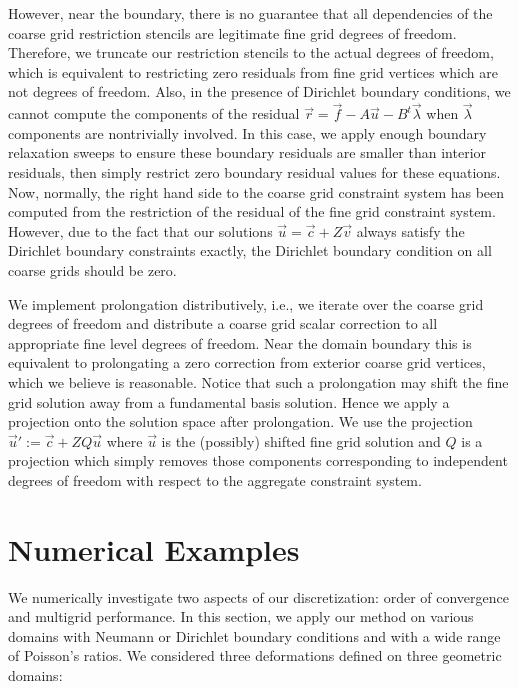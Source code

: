 However, near the boundary, there is no guarantee that all dependencies of the coarse grid restriction stencils are legitimate fine grid degrees of freedom. Therefore, we truncate our restriction stencils to the actual degrees of freedom, which is equivalent to restricting zero residuals from fine grid vertices which are not degrees of freedom. Also, in the presence of Dirichlet boundary conditions, we cannot compute the components of the residual $\vec{r} = \vec{f} - A \vec{u} - B^t \vec{\lambda}$ when $\vec{\lambda}$ components are nontrivially involved. In this case, we apply enough boundary relaxation sweeps to ensure these boundary residuals are smaller than interior residuals, then simply restrict zero boundary residual values for these equations. Now, normally, the right hand side to the coarse grid constraint system has been computed from the restriction of the residual of the fine grid constraint system. However, due to the fact that our solutions $\vec{u} = \vec{c} + Z \vec{v}$ always satisfy the Dirichlet boundary constraints exactly, the Dirichlet boundary condition on all coarse grids should be zero.

We implement prolongation distributively, i.e., we iterate over the coarse grid degrees of freedom and distribute a coarse grid scalar correction to all appropriate fine level degrees of freedom. Near the domain boundary this is equivalent to prolongating a zero correction from exterior coarse grid vertices, which we believe is reasonable. Notice that such a prolongation may shift the fine grid solution away from a fundamental basis solution. Hence we apply a projection onto the solution space after prolongation. We use the projection $\vec{u}' := \vec{c} + Z Q \vec{u}$ where $\vec{u}$ is the (possibly) shifted fine grid solution and $Q$ is a projection which simply removes those components corresponding to independent degrees of freedom with respect to the aggregate constraint system.

\section{Numerical Examples} \label{sec:chap5.examples}

We numerically investigate two aspects of our discretization: order of convergence and multigrid performance. In this section, we apply our method on various domains with Neumann or Dirichlet boundary conditions and with a wide range of Poisson's ratios. We considered three deformations defined on three geometric domains:

